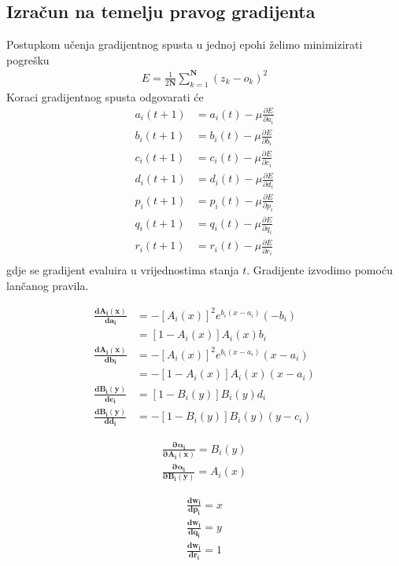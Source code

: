\documentclass[paper=a4, fontsize=11pt]{scrartcl} %
\numberwithin{equation}{section} %
\numberwithin{figure}{section} %
\numberwithin{table}{section} %
\begin{document}
\subsection{Izračun na temelju pravog gradijenta}
Postupkom učenja gradijentnog spusta u jednoj epohi želimo minimizirati pogrešku 
\begin{align*}
E = \frac{1}{2\mathbf{N}} \sum_{k=1}^{\mathbf{N}} (z_k - o_k)^2
\end{align*}
Koraci gradijentnog spusta odgovarati će
\begin{align*}
a_i(t+1) &= a_i(t) - \mu  \frac{\partial E}{\partial a_i}  \\
b_i(t+1) &= b_i(t) - \mu  \frac{\partial E}{\partial b_i}  \\
c_i(t+1) &= c_i(t) - \mu  \frac{\partial E}{\partial c_i}  \\
d_i(t+1) &= d_i(t) - \mu  \frac{\partial E}{\partial d_i}  \\
p_i(t+1) &= p_i(t) - \mu  \frac{\partial E}{\partial p_i}  \\
q_i(t+1) &= q_i(t) - \mu  \frac{\partial E}{\partial q_i}  \\
r_i(t+1) &= r_i(t) - \mu  \frac{\partial E}{\partial r_i}  \\
\end{align*} 
gdje se gradijent evaluira u vrijednostima stanja $t$. Gradijente izvodimo pomoću lančanog pravila.


\begin{align*}
\mathbf{\frac{dA_i(x)}{da_i}} &= -[A_i(x)]^2 e^{b_i(x - a_i)}(-b_i) \\&= [1 - A_i(x)] A_i(x) b_i \\
\mathbf{\frac{dA_i(x)}{db_i}} &= -[A_i(x)]^2 e ^{b_i(x - a_i)}(x - a_i)\\ &= -[1 - A_i(x)]A_i(x)(x - a_i) \\
\mathbf{\frac{dB_i(y)}{dc_i}} &= [1 - B_i(y)]B_i(y) d_i \\
\mathbf{\frac{dB_i(y)}{dd_i}} &= -[1 - B_i(y)] B_i(y) (y - c_i)
\end{align*}

\begin{align*}
\mathbf{\frac{\partial \alpha_i}{\partial A_i(x)}} = B_i(y) \\
\mathbf{\frac{\partial \alpha_i}{\partial B_i(y)}} = A_i(x) 
\end{align*}

\begin{align*}
\mathbf{\frac{dw_i}{dp_i}} = x \\
\mathbf{\frac{dw_i}{dq_i}} = y \\
\mathbf{\frac{dw_i}{dr_i}} = 1 \\
\end{align*}
\end{document}
